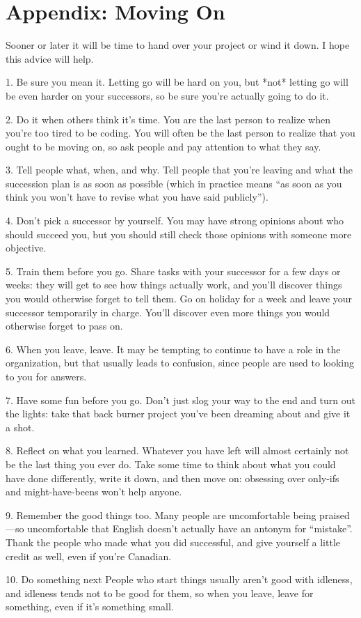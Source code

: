 \documentclass[10pt,letterpaper]{article}
\begin{document}
\section*{Appendix: Moving On}

Sooner or later it will be time to hand over your project or wind it down.
I hope this advice will help.

1.  Be sure you mean it.
    Letting go will be hard on you,
    but *not* letting go will be even harder on your successors,
    so be sure you're actually going to do it.

2.  Do it when others think it's time.
    You are the last person to realize when you're too tired to be coding.
    You will often be the last person to realize that you ought to be moving on,
    so ask people and pay attention to what they say.

3.  Tell people what, when, and why.
    Tell people that you're leaving and what the succession plan is as soon as possible
    (which in practice means ``as soon as you think you won't have to revise what you have said publicly'').

4.  Don't pick a successor by yourself.
    You may have strong opinions about who should succeed you,
    but you should still check those opinions with someone more objective.

5.  Train them before you go.
    Share tasks with your successor for a few days or weeks:
    they will get to see how things actually work,
    and you'll discover things you would otherwise forget to tell them.
    Go on holiday for a week and leave your successor temporarily in charge.
    You'll discover even more things you would otherwise forget to pass on.

6.  When you leave, leave.
    It may be tempting to continue to have a role in the organization,
    but that usually leads to confusion,
    since people are used to looking to you for answers.

7.  Have some fun before you go.
    Don't just slog your way to the end and turn out the lights:
    take that back burner project you've been dreaming about and give it a shot.

8.  Reflect on what you learned.
    Whatever you have left will almost certainly not be the last thing you ever do.
    Take some time to think about what you could have done differently,
    write it down,
    and then move on:
    obsessing over only-ifs and might-have-beens won't help anyone.

9.  Remember the good things too.
    Many people are uncomfortable being praised---so uncomfortable that
    English doesn't actually have an antonym for ``mistake''.
    Thank the people who made what you did successful,
    and give yourself a little credit as well,
    even if you're Canadian.

10. Do something next
    People who start things usually aren't good with idleness,
    and idleness tends not to be good for them,
    so when you leave,
    leave for something,
    even if it's something small.


\end{document}
